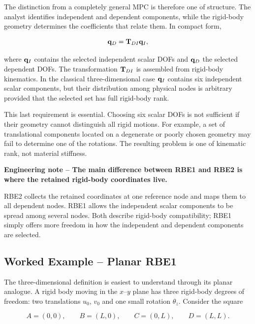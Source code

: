 The distinction from a completely general MPC is therefore one of structure.
The analyst identifies independent and dependent components, while the rigid-body
geometry determines the coefficients that relate them. In compact form,

\begin{equation}\label{rbe1-general-map}
    \mathbf{q}_D = \mathbf{T}_{DI}\mathbf{q}_I,
\end{equation}

where $\mathbf{q}_I$ contains the selected independent scalar DOFs and
$\mathbf{q}_D$ the selected dependent DOFs. The transformation
$\mathbf{T}_{DI}$ is assembled from rigid-body kinematics. In the classical
three-dimensional case $\mathbf{q}_I$ contains six independent scalar components,
but their distribution among physical nodes is arbitrary provided that the
selected set has full rigid-body rank.

This last requirement is essential. Choosing six scalar DOFs is not sufficient
if their geometry cannot distinguish all rigid motions. For example, a set of
translational components located on a degenerate or poorly chosen geometry may
fail to determine one of the rotations. The resulting problem is one of
kinematic rank, not material stiffness.

\begin{bbox}
\textbf{Engineering note -- The main difference between RBE1 and RBE2 is where the retained rigid-body coordinates live.}

RBE2 collects the retained coordinates at one reference node and maps them to
all dependent nodes. RBE1 allows the independent scalar components to be spread
among several nodes. Both describe rigid-body compatibility; RBE1 simply offers
more freedom in how the independent and dependent components are selected.
\end{bbox}

\subsection{Worked Example -- Planar RBE1}

The three-dimensional definition is easiest to understand through its planar
analogue. A rigid body moving in the $x$--$y$ plane has three rigid-body degrees
of freedom: two translations $u_0$, $v_0$ and one small rotation
$\theta_z$. Consider the square

\begin{equation}
    A=(0,0),\qquad
    B=(L,0),\qquad
    C=(0,L),\qquad
    D=(L,L).
\end{equation}

